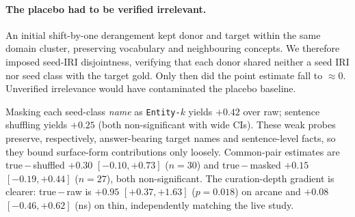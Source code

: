 \documentclass[10pt,twocolumn]{article}
\begin{document}
\paragraph{The placebo had to be verified irrelevant.} An initial shift-by-one derangement kept donor and target within the same domain cluster, preserving vocabulary and neighbouring concepts. We therefore imposed seed-IRI disjointness, verifying that each donor shared neither a seed IRI nor seed class with the target gold. Only then did the point estimate fall to $\approx0$. Unverified irrelevance would have contaminated the placebo baseline.

Masking each seed-class \emph{name} as \texttt{Entity-$k$} yields $+0.42$ over raw; sentence shuffling yields $+0.25$ (both non-significant with wide CIs). These weak probes preserve, respectively, answer-bearing target names and sentence-level facts, so they bound surface-form contributions only loosely. Common-pair estimates are true\,$-$\,shuffled $+0.30$ $[-0.10,+0.73]$ ($n=30$) and true\,$-$\,masked $+0.15$ $[-0.19,+0.44]$ ($n=27$), both non-significant. The curation-depth gradient is clearer: true\,$-$\,raw is $+0.95$ $[+0.37,+1.63]$ ($p=0.018$) on arcane and $+0.08$ $[-0.46,+0.62]$ (ns) on thin, independently matching the live study.
\end{document}
